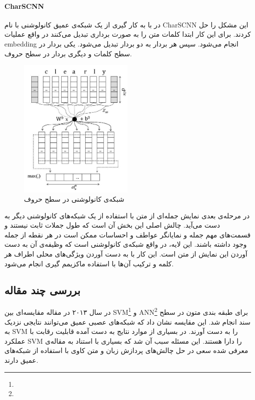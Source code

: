 \documentclass[12pt, a4paper, oneside]{report}
\begin{document}
\paragraph{CharSCNN} \hfill \break

در
\cite{dos2014deep}
با به کار گیری از یک شبکه‌ی عمیق کانولوشنی با نام
CharSCNN
این مشکل را حل کردند. برای این کار ابتدا کلمات متن را به صورت برداری تبدیل می‌کنند در واقع عملیات
embedding
انجام می‌شود. سپس هر بردار به دو بردار تبدیل می‌شود. یکی بردار در سطح کلمات و دیگری بردار در سطح حروف.

\begin{figure}[!ht]
    \centering
    \includegraphics[width=0.5\textwidth]{CHARCNN}
    \caption{ شبکه‌ی کانولوشنی در سطح حروف }
    \label{fig:CHARCNN}
\end{figure}

در مرحله‌ی بعدی نمایش جمله‌ای از متن با استفاده از یک شبکه‌های کانولوشنی دیگر به دست می‌آید.
چالش اصلی این بخش آن است که طول جملات ثابت نیستند و قسمت‌های مهم جمله و نمایانگر عواطف و احساسات
ممکن است در هر نقطه از جمله وجود داشته باشند. این لایه، در واقع شبکه‌ی کانولوشنی است که وظیفه‌ی آن
به دست آوردن این نمایش از متن است. این کار با به دست آوردن ویژگی‌های محلی اطراف هر کلمه و ترکیب
آن‌ها با استفاده ماکزیمم گیری انجام می‌شود.

\subsection{بررسی چند مقاله}

در سال ۲۰۱۳ در مقاله
\cite{Moraes2013DocumentlevelSC}
مقایسه‌ای بین
SVM\footnote{}
و
ANN\footnote{}
برای طبقه بندی متون در سطح سند انجام شد. این مقایسه نشان داد که شبکه‌‌های عصبی عمیق می‌توانند نتایجی نزدیک به
SVM
را به دست آورند. در بسیاری از موارد نتایج به دست آمده قابلیت رقابت با عملکرد‌
SVM
را دارا هستند. این مسئله سبب آن شد که بسیاری با استناد به مقاله‌ی معرفی شده سعی در حل چالش‌های پردازش زبان و متن کاوی
با استفاده از شبکه‌های عمیق دارند.
\end{document}
